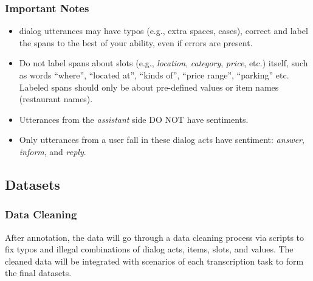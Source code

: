 \documentclass[11pt,a4paper]{article}
\begin{document}
\subsubsection{Important Notes}
\begin{itemize}
\itemsep0em
    \item dialog utterances may have typos (e.g., extra spaces, cases), correct and label the spans to the best of your ability, even if errors are present. %
    \item Do not label spans about slots (e.g., \textit{location}, \textit{category}, \textit{price}, etc.) itself, such as words ``where'', ``located at'', ``kinds of'', ``price range'', ``parking'' etc. 
    Labeled spans should only be about pre-defined values or item names (restaurant names).
    \item Utterances from the \textit{assistant} side DO NOT have sentiments.
    \item Only utterances from a user fall in these dialog acts have sentiment: \textit{answer}, \textit{inform}, and \textit{reply}.
    
\end{itemize}

\subsection{Datasets}

\subsubsection{Data Cleaning}
After annotation, the data will go through a data cleaning process via scripts to fix typos and illegal combinations of dialog acts, items, slots, and values. The cleaned data will be integrated with scenarios of each transcription task to form the final datasets.
\end{document}
